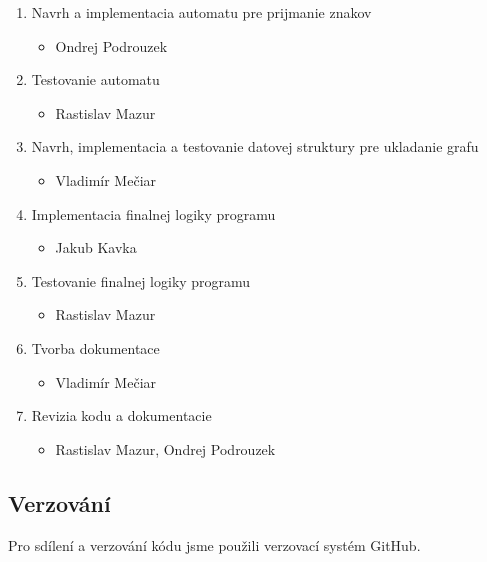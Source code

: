 \begin{enumerate}
    \item[] Navrh a implementacia automatu pre prijmanie znakov
    \begin{itemize}[noitemsep,topsep=0pt]
        \item Ondrej Podrouzek
    \end{itemize}

    \item[] Testovanie automatu
    \begin{itemize}[noitemsep,topsep=0pt]
        \item Rastislav Mazur
    \end{itemize}

    \item[] Navrh, implementacia a testovanie datovej struktury pre ukladanie grafu
    \begin{itemize}[noitemsep,topsep=0pt]
        \item Vladimír Mečiar
    \end{itemize}


    \item[] Implementacia finalnej logiky programu
    \begin{itemize}[noitemsep,topsep=0pt]
        \item Jakub Kavka
    \end{itemize}

    \item[] Testovanie finalnej logiky programu
    \begin{itemize}[noitemsep,topsep=0pt]
        \item Rastislav Mazur
    \end{itemize}


    \item[] Tvorba dokumentace
    \begin{itemize}[noitemsep,topsep=0pt]
        \item Vladimír Mečiar
    \end{itemize}

    \item[] Revizia kodu a dokumentacie
    \begin{itemize}[noitemsep,topsep=0pt]
        \item Rastislav Mazur, Ondrej Podrouzek
    \end{itemize}

\end{enumerate}


\subsection{Verzování}
Pro sdílení a verzování kódu jsme použili verzovací systém GitHub.

